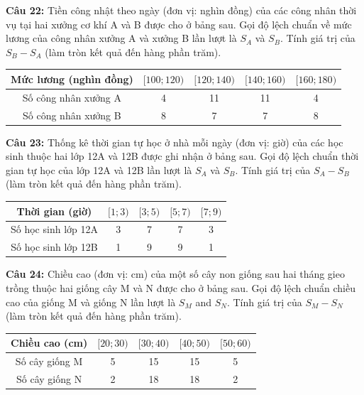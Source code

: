 \documentclass[12pt]{article}
\begin{document}
	\vspace{4mm}
	
	\noindent \textbf{Câu 22:} Tiền công nhật theo ngày (đơn vị: nghìn đồng) của các công nhân thời vụ tại hai xưởng cơ khí A và B được cho ở bảng sau. Gọi độ lệch chuẩn về mức lương của công nhân xưởng A và xưởng B lần lượt là $S_A$ và $S_B$. Tính giá trị của $S_B - S_A$ (làm tròn kết quả đến hàng phần trăm).
	\begin{center}
		\renewcommand{\arraystretch}{1.3}
		\begin{tabular}{|c|c|c|c|c|}
			\hline
			Mức lương (nghìn đồng) & $[100; 120)$ & $[120; 140)$ & $[140; 160)$ & $[160; 180)$ \\
			\hline
			Số công nhân xưởng A & 4 & 11 & 11 & 4 \\
			\hline
			Số công nhân xưởng B & 8 & 7 & 7 & 8 \\
			\hline
		\end{tabular}
	\end{center}
	
	\vspace{4mm}
	
	\noindent \textbf{Câu 23:} Thống kê thời gian tự học ở nhà mỗi ngày (đơn vị: giờ) của các học sinh thuộc hai lớp 12A và 12B được ghi nhận ở bảng sau. Gọi độ lệch chuẩn thời gian tự học của lớp 12A và 12B lần lượt là $S_A$ và $S_B$. Tính giá trị của $S_A - S_B$ (làm tròn kết quả đến hàng phần trăm).
	\begin{center}
		\renewcommand{\arraystretch}{1.3}
		\begin{tabular}{|c|c|c|c|c|}
			\hline
			Thời gian (giờ) & $[1; 3)$ & $[3; 5)$ & $[5; 7)$ & $[7; 9)$ \\
			\hline
			Số học sinh lớp 12A & 3 & 7 & 7 & 3 \\
			\hline
			Số học sinh lớp 12B & 1 & 9 & 9 & 1 \\
			\hline
		\end{tabular}
	\end{center}
	
	\vspace{4mm}
	
	\noindent \textbf{Câu 24:} Chiều cao (đơn vị: cm) của một số cây non giống sau hai tháng gieo trồng thuộc hai giống cây M và N được cho ở bảng sau. Gọi độ lệch chuẩn chiều cao của giống M và giống N lần lượt là $S_M$ and $S_N$. Tính giá trị của $S_M - S_N$ (làm tròn kết quả đến hàng phần trăm).
	\begin{center}
		\renewcommand{\arraystretch}{1.3}
		\begin{tabular}{|c|c|c|c|c|}
			\hline
			Chiều cao (cm) & $[20; 30)$ & $[30; 40)$ & $[40; 50)$ & $[50; 60)$ \\
			\hline
			Số cây giống M & 5 & 15 & 15 & 5 \\
			\hline
			Số cây giống N & 2 & 18 & 18 & 2 \\
			\hline
		\end{tabular}
	\end{center}
	
\end{document}
